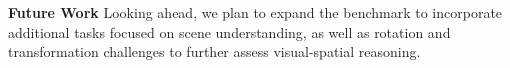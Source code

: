 \textbf{Future Work}\hspace{.3cm} Looking ahead, we plan to expand the benchmark to incorporate additional tasks focused on scene understanding, as well as rotation and transformation challenges to further assess visual-spatial reasoning.